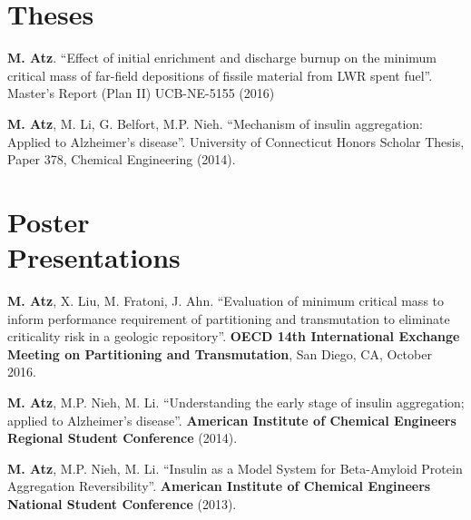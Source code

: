 \documentclass[margin,line]{resume}
\begin{document}
\begin{resume}
\begin{bibenum}
\end{bibenum}


\section{\mysidestyle Theses\\}
\begin{bibenum}

    \item \textbf{M. Atz}. ``Effect of initial enrichment and discharge burnup on the minimum critical mass of far-field depositions of fissile material from LWR spent fuel''. Master’s Report (Plan II) UCB-NE-5155 (2016)

    \item \textbf{M. Atz}, M. Li, G. Belfort, M.P. Nieh. ``Mechanism of insulin aggregation: Applied to Alzheimer’s disease''. University of Connecticut Honors Scholar Thesis, Paper 378, Chemical Engineering (2014).

\end{bibenum}


\section{\mysidestyle Poster\\Presentations}
\begin{bibenum}

    \item \textbf{M. Atz}, X. Liu, M. Fratoni, J. Ahn. ``Evaluation of minimum critical mass to inform performance requirement of partitioning and transmutation to eliminate criticality risk in a geologic repository''. \textbf{OECD 14th International Exchange Meeting on Partitioning and Transmutation}, San Diego, CA, October 2016.
    
    \item \textbf{M. Atz}, M.P. Nieh, M. Li. ``Understanding the early stage of insulin aggregation; applied to Alzheimer’s disease''. \textbf{American Institute of Chemical Engineers Regional Student Conference} (2014).

    \item \textbf{M. Atz}, M.P. Nieh, M. Li. ``Insulin as a Model System for Beta-Amyloid Protein Aggregation Reversibility''. \textbf{American Institute of Chemical Engineers National Student Conference} (2013).


\end{bibenum}
\end{resume}
\end{document}
